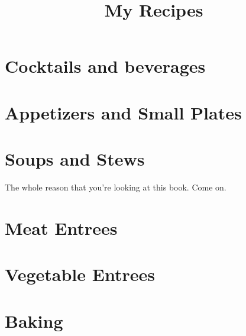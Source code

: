 \documentclass[12pt]{cookbook}
\title{My Recipes}
\begin{document}
\chapter*{Cocktails and beverages}
\pagebreak


\chapter*{Appetizers and Small Plates}
\chapter*{Soups and Stews}
The whole reason that you're looking at this book. Come on.
\pagebreak





\chapter*{Meat Entrees}
\pagebreak


\chapter*{Vegetable Entrees}
\pagebreak


\chapter*{Baking}
\end{document}
